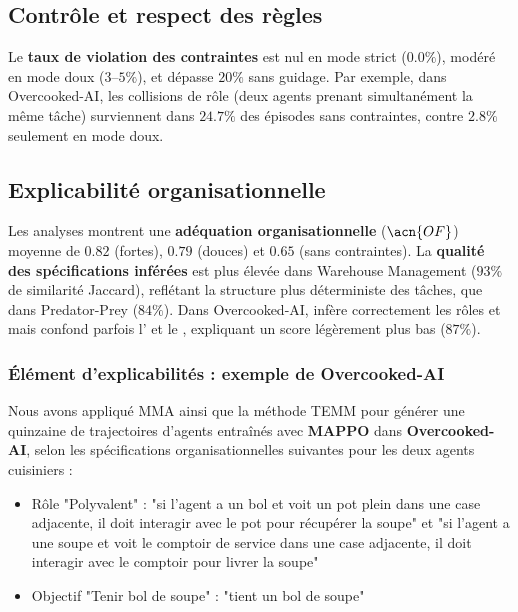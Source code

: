 \subsection*{Contrôle et respect des règles}

Le \textbf{taux de violation des contraintes} est nul en mode strict ($0.0\%$), modéré en mode doux ($3$–$5\%$), et dépasse $20\%$ sans guidage.
Par exemple, dans Overcooked-AI, les collisions de rôle (deux agents prenant simultanément la même tâche) surviennent dans $24.7\%$ des épisodes sans contraintes, contre $2.8\%$ seulement en mode doux.

\subsection*{Explicabilité organisationnelle}

Les analyses  montrent une \textbf{adéquation organisationnelle} ($\acn{OF}$) moyenne de $0.82$ (fortes), $0.79$ (douces) et $0.65$ (sans contraintes).
La \textbf{qualité des spécifications inférées} est plus élevée dans Warehouse Management ($93\%$ de similarité Jaccard), reflétant la structure plus déterministe des tâches, que dans Predator-Prey ($84\%$).
Dans Overcooked-AI,  infère correctement les rôles  et  mais confond parfois l' et le , expliquant un score légèrement plus bas ($87\%$).


\subsubsection*{Élément d'explicabilités : exemple de Overcooked-AI}

Nous avons appliqué MMA ainsi que la méthode TEMM pour générer une quinzaine de trajectoires d'agents entraînés avec \textbf{MAPPO} dans \textbf{Overcooked-AI}, selon les spécifications organisationnelles suivantes pour les deux agents cuisiniers :
%
\begin{itemize}
  \item Rôle "Polyvalent" : "si l'agent a un bol et voit un pot plein dans une case adjacente, il doit interagir avec le pot pour récupérer la soupe" et "si l'agent a une soupe et voit le comptoir de service dans une case adjacente, il doit interagir avec le comptoir pour livrer la soupe"
  \item Objectif "Tenir bol de soupe" : "tient un bol de soupe"
\end{itemize}


